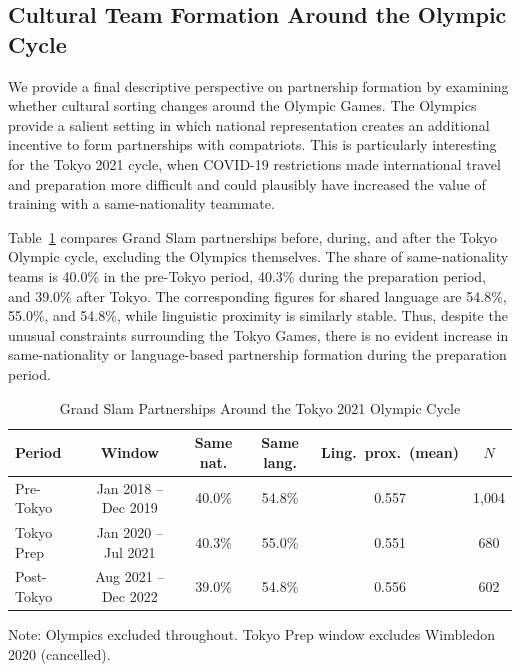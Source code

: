 \documentclass[10pt]{article}
\begin{document}
\subsection{Cultural Team Formation Around the Olympic Cycle}

We provide a final descriptive perspective on partnership formation by examining whether cultural sorting changes around the Olympic Games. The Olympics provide a salient setting in which national representation creates an additional incentive to form partnerships with compatriots. This is particularly interesting for the Tokyo 2021 cycle, when COVID-19 restrictions made international travel and preparation more difficult and could plausibly have increased the value of training with a same-nationality teammate.

Table~\ref{tab:t2a} compares Grand Slam partnerships before, during, and after the Tokyo Olympic cycle, excluding the Olympics themselves. The share of same-nationality teams is 40.0\% in the pre-Tokyo period, 40.3\% during the preparation period, and 39.0\% after Tokyo. The corresponding figures for shared language are 54.8\%, 55.0\%, and 54.8\%, while linguistic proximity is similarly stable. Thus, despite the unusual constraints surrounding the Tokyo Games, there is no evident increase in same-nationality or language-based partnership formation during the preparation period.

\renewcommand{\thetable}{2A}
\begin{table}[htbp]
\color{blue}
\centering
\caption{Grand Slam Partnerships Around the Tokyo 2021 Olympic Cycle \label{tab:t2a}}
\begin{threeparttable}
\begin{tabular}{lccccc}
\toprule
Period & Window & Same nat. & Same lang. & Ling.\ prox.\ (mean) & $N$ \\
\midrule
Pre-Tokyo & Jan 2018 -- Dec 2019 & 40.0\% & 54.8\% & 0.557 & 1,004 \\
Tokyo Prep & Jan 2020 -- Jul 2021 & 40.3\% & 55.0\% & 0.551 & 680 \\
Post-Tokyo & Aug 2021 -- Dec 2022 & 39.0\% & 54.8\% & 0.556 & 602 \\
\bottomrule
\end{tabular}
\begin{tablenotes}
\small
\item Note: Olympics excluded throughout. Tokyo Prep window excludes Wimbledon 2020 (cancelled).
\end{tablenotes}
\end{threeparttable}
\end{table}
\FloatBarrier
\end{document}
